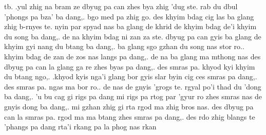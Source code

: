 {{		{tb}{{\color{fg}\scriptsize\tib\swasti. .yul zhig na bram ze dbyug pa can zhes bya zhig 'dug ste. rab du dbul 'phongs pa bza' ba dang,. bgo med pa zhig go. des khyim bdag cig las ba glang zhig b-rnyes te. nyin par spyad nas ba glang de khrid de khyim bdag de'i khyim du song ba dang,. de na khyim bdag ni zan za ste. dbyug pa can gyis ba glang de khyim gyi nang du btang ba dang,. ba glang sgo gzhan du song nas stor ro.. khyim bdag de zan de zos nas langs pa dang,. de na ba glang ma mthong nas des dbyug pa can la glang ga re zhes byas pa dang,. des smras pa. khyod kyi khyim du btang ngo,. .khyod kyis nga'i glang bor gyis slar byin cig ces smras pa dang,. des smras pa. ngas ma bor ro.. de nas de gnyis 'grogs te. rgyal po'i thad du 'dong ba dang,. 'u bu cag gi rigs pa dang mi rigs pa rtog par 'gyur ro zhes smras nas de gnyis dong ba dang,. mi gzhan zhig gi rta rgod ma zhig bros nas. des dbyug pa can la smras pa. rgod ma ma btang zhes smras pa dang,. des rdo zhig blangs te 'phangs pa dang rta'i rkang pa la phog nas rkan}}
	}%
}

\usepackage{tikz}
\usepackage{pgfplots,pgfplotstable}
%

\usepackage{tcolorbox}
\usepackage{multirow}
\usepackage{multicol}
\usepackage{colortbl} %
\usepackage{tabularx} %
\usepackage{subcaption} %
\usepackage{booktabs}
\setlength{\fboxrule}{0.075pt}

\usepackage[version=4]{mhchem}
\usepackage{chemfig}
\renewcommand*\printatom[1]{\footnotesize \ensuremath{\mathsf{#1}}}

